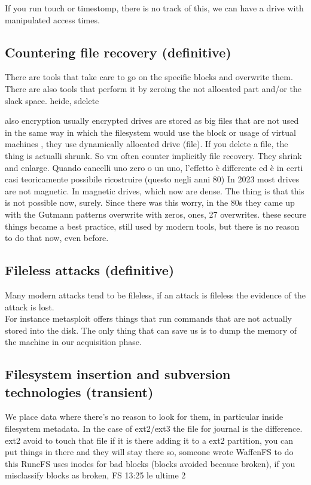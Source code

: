         If you run touch or timestomp, there is no track of this, we can have a drive with manipulated access times.
    \subsection{Countering file recovery (definitive)}
        There are tools that take care to go on the specific blocks and overwrite them. There are also tools that perform it by zeroing the not allocated part and/or the slack space.
        heide, sdelete

        also encryption usually encrypted drives are stored as big files that are not used in the same way in which the filesystem would use the block
        or usage of virtual machines , they use dynamically allocated drive (file). If you delete a file, the thing is actualli shrunk. So vm often counter implicitly file recovery.
        They shrink and enlarge.
        Quando cancelli uno zero o un uno, l'effetto è differente ed è in certi casi teoricamente possibile ricostruire (questo negli anni 80)
        In 2023 most drives are not magnetic. In magnetic drives, which now are dense. The thing is that this is not possible now, surely.
        Since there was this worry, in the 80s they came up with the Gutmann patterns 
        overwrite with zeros, ones, 27 overwrites.
        these secure things became a best practice, still used by modern tools, but there is no reason to do that now, even before.
    \subsection{Fileless attacks (definitive)}
        Many modern attacks tend to be fileless, if an attack is fileless the evidence of the attack is lost.\\
        For instance metasploit offers things that run commands that are not actually stored into the disk.
        The only thing that can save us is to dump the memory of the machine in our acquisition phase.
    \subsection{Filesystem insertion and subversion technologies (transient)}
        We place data where there's no reason to look for them, in particular inside filesystem metadata.
        In the case of ext2/ext3 the file for journal is the difference.
        ext2 avoid to touch that file if it is there 
        adding it to a ext2 partition, you can put things in there and they will stay there 
        so, someone wrote WaffenFS to do this 
        RuneFS uses inodes for bad blocks (blocks avoided because broken), if you misclassify blocks as broken, FS 
        13:25 le ultime 2 

